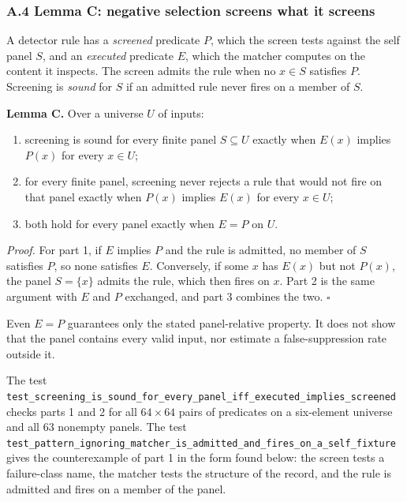 \documentclass[
  11pt,
]{article}
\providecommand{\tightlist}{%
  \setlength{\itemsep}{0pt}\setlength{\parskip}{0pt}}
\begin{document}
\subsubsection{A.4 Lemma C: negative selection screens what it
screens}\label{a.4-lemma-c-negative-selection-screens-what-it-screens}

A detector rule has a \emph{screened} predicate \(P\), which the screen
tests against the self panel \(S\), and an \emph{executed} predicate
\(E\), which the matcher computes on the content it inspects. The screen
admits the rule when no \(x \in S\) satisfies \(P\). Screening is
\emph{sound} for \(S\) if an admitted rule never fires on a member of
\(S\).

\textbf{Lemma C.} Over a universe \(U\) of inputs:

\begin{enumerate}
\def\labelenumi{\arabic{enumi}.}
\tightlist
\item
  screening is sound for every finite panel \(S \subseteq U\) exactly
  when \(E(x)\) implies \(P(x)\) for every \(x \in U\);
\item
  for every finite panel, screening never rejects a rule that would not
  fire on that panel exactly when \(P(x)\) implies \(E(x)\) for every
  \(x \in U\);
\item
  both hold for every panel exactly when \(E = P\) on \(U\).
\end{enumerate}

\emph{Proof.} For part 1, if \(E\) implies \(P\) and the rule is
admitted, no member of \(S\) satisfies \(P\), so none satisfies \(E\).
Conversely, if some \(x\) has \(E(x)\) but not \(P(x)\), the panel
\(S = \{x\}\) admits the rule, which then fires on \(x\). Part 2 is the
same argument with \(E\) and \(P\) exchanged, and part 3 combines the
two. \(\square\)

Even \(E=P\) guarantees only the stated panel-relative property. It does
not show that the panel contains every valid input, nor estimate a
false-suppression rate outside it.

The test
\nolinkurl{test_screening_is_sound_for_every_panel_iff_executed_implies_screened}
checks parts 1 and 2 for all \(64 \times 64\) pairs of predicates on a
six-element universe and all 63 nonempty panels. The test
\nolinkurl{test_pattern_ignoring_matcher_is_admitted_and_fires_on_a_self_fixture}
gives the counterexample of part 1 in the form found below: the screen
tests a failure-class name, the matcher tests the structure of the
record, and the rule is admitted and fires on a member of the panel.
\end{document}
